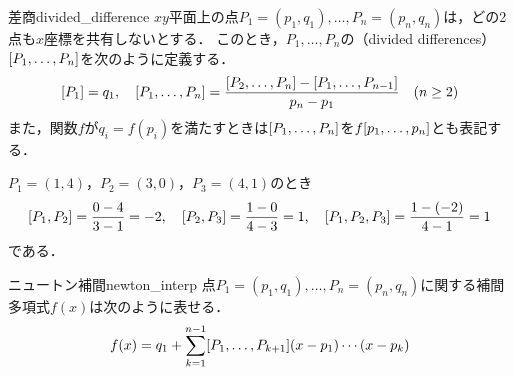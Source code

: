 \documentclass[../../main]{subfiles}
\begin{document}
\begin{definition}{差商}{divided_difference}
\(xy\)平面上の点\(P_1=(p_1,q_1),\dots,P_n=(p_n,q_n)\)は，どの2点も\(x\)座標を共有しないとする．
このとき，\(P_1,\dots,P_n\)の（divided differences）\(\divdiff{P_1,\dots,P_n}\)を次のように定義する\footnotemark ．
\[
  \divdiff{P_1} = q_1,
  \quad\divdiff{P_1,\dots,P_n} = \frac{\divdiff{P_2,\dots,P_n}-\divdiff{P_1,\dots,P_{n-1}}}{p_n-p_1}\quad(n\geq 2)
\]
また，関数\(f\)が\(q_i=f(p_i)\)を満たすときは\(\divdiff{P_1,\dots,P_n}\)を\(\divdiff[f]{p_1,\dots,p_n}\)とも表記する．
\end{definition}

\begin{example}
\label{example:divdiff}
\(P_1=(1,4)\)，\(P_2=(3,0)\)，\(P_3=(4,1)\)のとき
\[
  \divdiff{P_1,P_2} = \frac{0-4}{3-1} = -2,
  \quad\divdiff{P_2,P_3} = \frac{1-0}{4-3} = 1,
  \quad\divdiff{P_1,P_2,P_3} = \frac{1-(-2)}{4-1} = 1
\]
である．
\end{example}

\begin{theorem}{ニュートン補間}{newton_interp}
点\(P_1=(p_1,q_1),\dots,P_n=(p_n,q_n)\)に関する補間多項式\(f(x)\)は次のように表せる．
\begin{equation}
  \label{equation:newton_interp}
  f(x) = q_1+\sum_{k=1}^{n-1}\divdiff{P_1,\dots,P_{k+1}}(x-p_1)\dotsm(x-p_k)
\end{equation}
\end{theorem}
\end{document}

